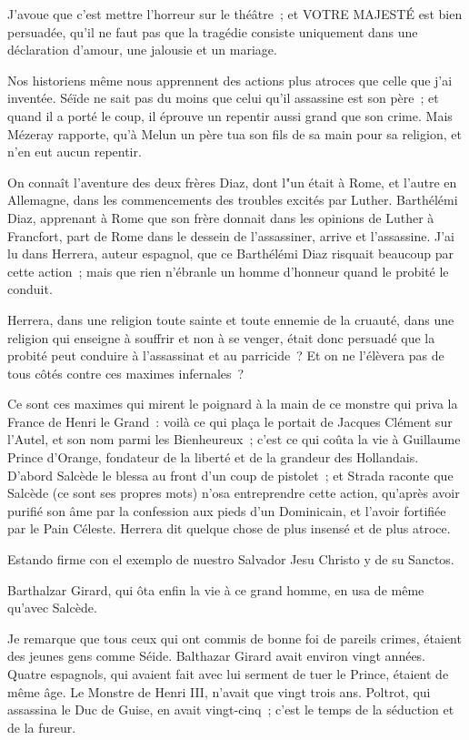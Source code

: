 \documentclass[french,twoside]{book} %
\begin{document}
J’avoue que c’est mettre l’horreur sur le théâtre ; et VOTRE MAJESTÉ est bien persuadée, qu’il ne faut pas que la tragédie consiste uniquement dans une déclaration d’amour, une jalousie et un mariage.\par
Nos historiens même nous apprennent des actions plus atroces que celle que j’ai inventée. Séïde ne sait pas du moins que celui qu’il assassine est son père ; et quand il a porté le coup, il éprouve un repentir aussi grand que son crime. Mais Mézeray rapporte, qu’à Melun un père tua son fils de sa main pour sa religion, et n’en eut aucun repentir.\par
On connaît l’aventure des deux frères Diaz, dont l"un était à Rome, et l’autre en Allemagne, dans les commencements des troubles excités par Luther. Barthélémi Diaz, apprenant à Rome que son frère donnait dans les opinions de Luther à Francfort, part de Rome dans le dessein de l’assassiner, arrive et l’assassine. J’ai lu dans Herrera, auteur espagnol, que ce Barthélémi Diaz risquait beaucoup par cette action ; mais que rien n’ébranle un homme d’honneur quand le probité le conduit.\par
Herrera, dans une religion toute sainte et toute ennemie de la cruauté, dans une religion qui enseigne à souffrir et non à se venger, était donc persuadé que la probité peut conduire à l’assassinat et au parricide ? Et on ne l’élèvera pas de tous côtés contre ces maximes infernales ?\par
Ce sont ces maximes qui mirent le poignard à la main de ce monstre qui priva la France de Henri le Grand : voilà ce qui plaça le portait de Jacques Clément sur l’Autel, et son nom parmi les Bienheureux ; c’est ce qui coûta la vie à Guillaume Prince d’Orange, fondateur de la liberté et de la grandeur des Hollandais. D’abord Salcède le blessa au front d’un coup de pistolet ; et Strada raconte que Salcède (ce sont ses propres mots) n’osa entreprendre cette action, qu’après avoir purifié son âme par la confession aux pieds d’un Dominicain, et l’avoir fortifiée par le Pain Céleste. Herrera dit quelque chose de plus insensé et de plus atroce.\par
Estando firme con el exemplo de nuestro Salvador Jesu Christo y de su Sanctos.\par
Barthalzar Girard, qui ôta enfin la vie à ce grand homme, en usa de même qu’avec Salcède.\par
Je remarque que tous ceux qui ont commis de bonne foi de pareils crimes, étaient des jeunes gens comme Séide. Balthazar Girard avait environ vingt années. Quatre espagnols, qui avaient fait avec lui serment de tuer le Prince, étaient de même âge. Le Monstre de Henri III, n’avait que vingt trois ans. Poltrot, qui assassina le Duc de Guise, en avait vingt-cinq ; c’est le temps de la séduction et de la fureur.\par
\end{document}
